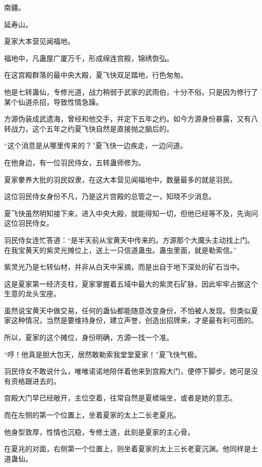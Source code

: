 
\begin{this_body}

南疆。

延寿山。

夏家大本营见闻福地。

福地中，凡蛊屋广厦万千，形成绵连宫殿，锦绣恢弘。

在这宫殿群落的最中央大殿，夏飞快双足踏地，行色匆匆。

他是七转蛊仙，专修光道，战力稍弱于武家的武雨伯，十分不俗。只是因为修行了某个仙道杀招，导致性情急躁。

方源伪装成武遗海，曾经和他交手，并定下五年之约。如今方源身份暴露，又有八转战力，这个五年之约夏飞快自然是直接抛之脑后的。

“这个消息是从哪里传来的？”夏飞快一边疾走，一边问道。

在他身边，有一位羽民侍女，五转蛊师修为。

夏家豢养大批的羽民奴隶，在这大本营见闻福地中，数量最多的就是羽民。

这位羽民侍女身份不凡，乃是这片宫殿的总管之一，知晓不少消息。

夏飞快虽然明知接下来，进入中央大殿，就能得知一切，但他已经等不及，先询问这位羽民侍女。

羽民侍女连忙答道：“是半天前从宝黄天中传来的。方源那个大魔头主动找上门。在我宝黄天的紫灵光摊位上，送上一只信道蛊虫。蛊虫里面，就是勒索信。”

紫灵光乃是七转仙材，并非从白天中采摘，而是出自于地下深处的矿石当中。

这是夏家第一经济支柱，夏家掌握着五域中最大的紫灵石矿脉，因此牢牢占据这个生意的龙头宝座。

虽然说宝黄天中做交易，任何的蛊仙都能随意改变身份，不怕被人发现。但类似夏家这种情况，当然是要维持身份，建立声誉，创造出招牌来，才是最有利可图的。

所以，夏家的这个摊位，身份明确，方源一找一个准。

“哼！他真是胆大包天，居然敢勒索我堂堂夏家！”夏飞快气极。

羽民侍女不敢说什么，唯唯诺诺地陪伴着他来到宫殿大门，便停下脚步。她可是没有资格跟进去的。

宫殿大门早已经敞开，主位空着，往常自然是夏槎端坐，或者是她的意志。

而在左侧的第一个位置上，坐着夏家的太上二长老夏兆。

他身型敦厚，性情也沉稳，专修土道，此刻是夏家的主心骨。

在夏兆的对面，右侧第一个位置上，则坐着夏家的太上三长老夏沉渊。他同样是土道蛊仙。


\end{this_body}
